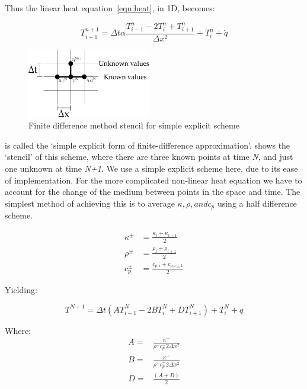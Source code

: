 Thus the linear heat equation~\cref{eqn:heat}, in 1D, becomes:

\begin{equation}
T_{i+1}^{n+1} =  \Delta t\alpha \frac{T_{i-1}^n-2T_i^n+T_{i+1}^n}{\Delta x^2} + T_i^n + \dot{q}
\label{eqn:simplefdm}
\end{equation}

\begin{figure}
  \begin{center}
    \includegraphics[width=0.48\textwidth]{./ablation/images/fdm-stencil.pdf}
  \end{center}
  \caption{Finite difference method stencil for simple explicit scheme}\label{fig:fdmstencil}
    \vspace{-20pt}
\end{figure}

 is called the `simple explicit form of finite-difference approximation'\cite{ozisik1994finite}.  shows the `stencil' of this scheme, where there are three known points at time \textit{N}, and just one unknown at time \textit{N+1}. We use a simple explicit scheme here, due to its ease of implementation. For the more complicated non-linear heat equation we have to account for the change of the medium between points in the space and time. The simplest method of achieving this is to average $\kappa, \rho, and c_p$ using a half difference scheme.

\begin{align}
\kappa^{\pm}&=\frac{\kappa_i+\kappa_{i\pm 1}}{2}\\
\rho^{\pm}&=\frac{\rho_i+\rho_{i\pm 1}}{2}\\
c_p^{\pm}&=\frac{c_{p,i}+c_{p,i\pm 1}}{2}
\end{align}

Yielding:

\begin{equation}
T^{N+1}=\Delta t (AT^N_{i-1}-2BT^N_{i}+DT^N_{i+1})+ T_i^N + \dot{q}
\end{equation}

Where:
\begin{align}
A=&\frac{\kappa^{-}}{\rho^{-}c_{p}^{-}2\Delta x^2} \nonumber \\
B=&\frac{\kappa^{+}}{\rho^{+}c_{p}^{+}2\Delta x^2} \label{eqn:coeffsABD}\\
D=&\frac{(A+B)}{2} \nonumber
\end{align}

